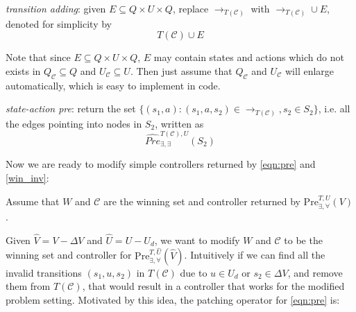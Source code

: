 \emph{transition adding}: given $ E \subseteq Q \times U \times Q$, replace $ \rightarrow_{T(\mathcal{C})} $ with $ \rightarrow_{T(\mathcal{C})}\cup E $, denoted for simplicity by
\begin{displaymath}
T(\mathcal{C})\cup E
\end{displaymath}

Note that since $ E \subseteq Q\times U\times Q $, $ E $ may contain states and actions which do not exists in $ Q_{\mathcal{C}}\subseteq Q $ and $ U_{\mathcal{C}}\subseteq U $. Then just assume that $ Q_{\mathcal{C}} $ and $ U_{\mathcal{C}} $ will enlarge automatically, which is easy to implement in code.


\emph{state-action pre}: return the set $ \{(s_1,a): (s_1,a,s_2)\in \rightarrow_{T(\mathcal{C})}, s_2\in S_2\} $, i.e. all the edges pointing into nodes in $ S_2 $, written as
\begin{displaymath}
\widehat{Pre}^{T(\mathcal{C}),U}_{\exists,\exists}(S_2)
\end{displaymath}

Now we are ready to modify simple controllers returned by \eqref{eqn:pre} and \eqref{win_inv}:

Assume that  $ W $ and $ \mathcal{C} $ are the winning set and controller returned by $ \text{Pre}_{\exists,\forall}^{T, U}(V) $. 

Given $ \widehat{V}= V-\Delta V $ and $ \widehat{U} = U-U_d $, we want to modify $ W $ and $ \mathcal{C} $ to be the winning set and controller for $ \text{Pre}_{\exists,\forall}^{T,\widehat{U}}(\widehat{V}) $. Intuitively if we can find all the invalid transitions $ (s_1,u,s_2) $ in $ T(\mathcal{C}) $ due to $ u\in U_d $ or $ s_2\in\Delta V $, and remove them from $ T(\mathcal{C}) $, that would result in a controller that works for the modified problem setting. Motivated by this idea, the patching operator for \eqref{eqn:pre} is:

